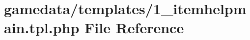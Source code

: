 \hypertarget{1__itemhelpmain_8tpl_8php}{\section{gamedata/templates/1\+\_\+itemhelpmain.tpl.\+php File Reference}
\label{1__itemhelpmain_8tpl_8php}
}
